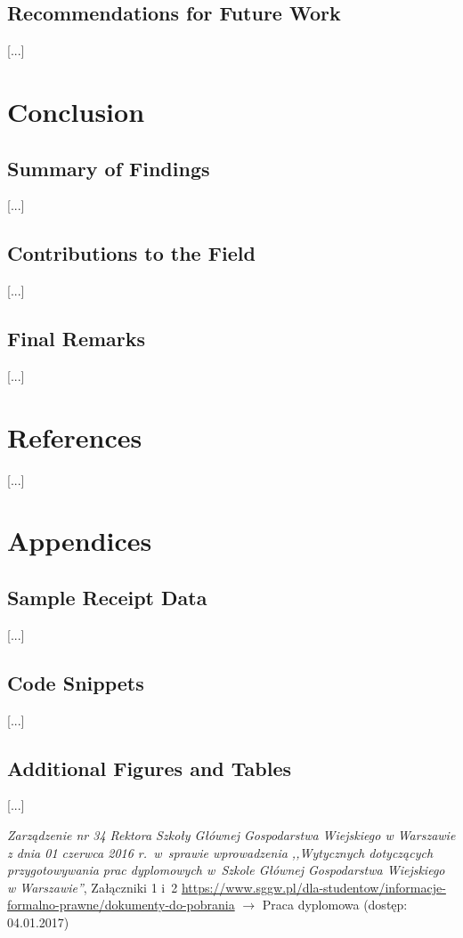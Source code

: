 \documentclass{SGGW-thesis-EN}
\begin{document}
\section{Recommendations for Future Work}
[...]

\chapter{Conclusion}

\section{Summary of Findings}
[...]

\section{Contributions to the Field}
[...]

\section{Final Remarks}
[...]

\chapter{References}
[...]

\chapter{Appendices}

\section{Sample Receipt Data}
[...]

\section{Code Snippets}
[...]

\section{Additional Figures and Tables}
[...]

\begin{thebibliography}{9}
\textit{Zarządzenie nr 34 Rektora Szkoły Głównej Gospodarstwa Wiejskiego w Warszawie z dnia 01 czerwca 2016 r.\ w~sprawie wprowadzenia ,,Wytycznych dotyczących
przygotowywania prac dyplomowych w~Szkole Głównej Gospodarstwa Wiejskiego w Warszawie''}, Załączniki 1 i~2
\url{https://www.sggw.pl/dla-studentow/informacje-formalno-prawne/dokumenty-do-pobrania}
$\rightarrow$ Praca dyplomowa (dostęp: 04.01.2017)
\end{thebibliography}

\beforelastpage
\end{document}
